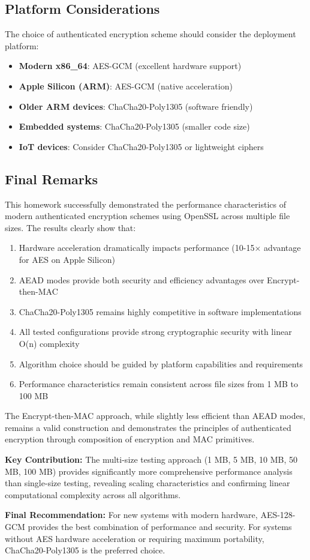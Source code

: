 \documentclass[12pt,a4paper]{article}
\begin{document}
\subsection{Platform Considerations}

The choice of authenticated encryption scheme should consider the deployment platform:

\begin{itemize}
    \item \textbf{Modern x86\_64}: AES-GCM (excellent hardware support)
    \item \textbf{Apple Silicon (ARM)}: AES-GCM (native acceleration)
    \item \textbf{Older ARM devices}: ChaCha20-Poly1305 (software friendly)
    \item \textbf{Embedded systems}: ChaCha20-Poly1305 (smaller code size)
    \item \textbf{IoT devices}: Consider ChaCha20-Poly1305 or lightweight ciphers
\end{itemize}

\subsection{Final Remarks}

This homework successfully demonstrated the performance characteristics of modern authenticated encryption schemes using OpenSSL across multiple file sizes. The results clearly show that:

\begin{enumerate}
    \item Hardware acceleration dramatically impacts performance (10-15× advantage for AES on Apple Silicon)
    \item AEAD modes provide both security and efficiency advantages over Encrypt-then-MAC
    \item ChaCha20-Poly1305 remains highly competitive in software implementations
    \item All tested configurations provide strong cryptographic security with linear O(n) complexity
    \item Algorithm choice should be guided by platform capabilities and requirements
    \item Performance characteristics remain consistent across file sizes from 1 MB to 100 MB
\end{enumerate}

The Encrypt-then-MAC approach, while slightly less efficient than AEAD modes, remains a valid construction and demonstrates the principles of authenticated encryption through composition of encryption and MAC primitives.

\textbf{Key Contribution:} The multi-size testing approach (1 MB, 5 MB, 10 MB, 50 MB, 100 MB) provides significantly more comprehensive performance analysis than single-size testing, revealing scaling characteristics and confirming linear computational complexity across all algorithms.

\textbf{Final Recommendation:} For new systems with modern hardware, AES-128-GCM provides the best combination of performance and security. For systems without AES hardware acceleration or requiring maximum portability, ChaCha20-Poly1305 is the preferred choice.
\end{document}
